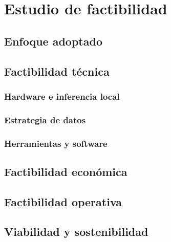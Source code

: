 \clearpage
\chapter{Estudio de factibilidad}
\label{chap:factibilidad}

\section{Enfoque adoptado}

\section{Factibilidad técnica}
\subsection{Hardware e inferencia local}
\subsection{Estrategia de datos}
\subsection{Herramientas y software}

\section{Factibilidad económica}

\section{Factibilidad operativa}

\section{Viabilidad y sostenibilidad}
